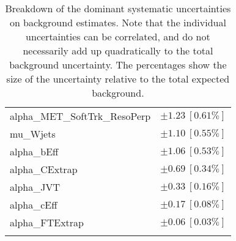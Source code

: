 \begin{table}
\begin{center}
\begin{tabular*}{\textwidth}{@{\extracolsep{\fill}}lc}
alpha\_MET\_SoftTrk\_ResoPerp         & $\pm 1.23\ [0.61\%] $       \\
mu\_Wjets         & $\pm 1.10\ [0.55\%] $       \\
alpha\_bEff         & $\pm 1.06\ [0.53\%] $       \\
alpha\_CExtrap         & $\pm 0.69\ [0.34\%] $       \\
alpha\_JVT         & $\pm 0.33\ [0.16\%] $       \\
alpha\_cEff         & $\pm 0.17\ [0.08\%] $       \\
alpha\_FTExtrap         & $\pm 0.06\ [0.03\%] $       \\
\noalign{\smallskip}\hline\noalign{\smallskip}
\end{tabular*}
\end{center}
\caption[Breakdown of uncertainty on background estimates]{
Breakdown of the dominant systematic uncertainties on background estimates.
Note that the individual uncertainties can be correlated, and do not necessarily add up quadratically to 
the total background uncertainty. The percentages show the size of the uncertainty relative to the total expected background.
\label{table.results.bkgestimate.uncertainties.VRTopBT0}}
\end{table}
%